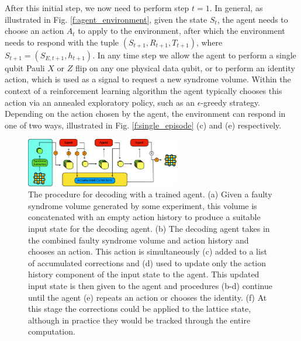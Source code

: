 \documentclass[twocolumn,preprintnumbers,amsmath,amssymb,notitlepage,nofootinbib,longbibliography,superscriptaddress,aps,pra,10pt]{revtex4-1}
\begin{document}
    After this initial step, we now need to perform step $t=1$. 
    In general, as illustrated in Fig. \ref{f:agent_environment}, given the state $S_t$, the agent needs to choose an action $A_t$ to apply to the environment, after which the environment needs to respond with the tuple $(S_{t+1}, R_{t+1}, T_{t+1})$, where $S_{t+1}=(S_{E,{t+1}},h_{t+1})$.
    In any time step we allow the agent to perform a single qubit Pauli $X$ or $Z$ flip on any one physical data qubit, or to perform an identity action, which is used as a signal to request a new syndrome volume.
    Within the context of a reinforcement learning algorithm the agent typically chooses this action via an annealed exploratory policy, such as an $\epsilon$-greedy strategy.
    Depending on the action chosen by the agent, the environment can respond in one of two ways, illustrated in Fig. \ref{f:single_episode} (c) and (e) respectively.

    \begin{figure}
      \centering
      \includegraphics[width=0.6\textwidth]{figures/agent_decoding.pdf}
      \caption{The procedure for decoding with a trained agent. (a) Given a faulty syndrome volume generated by some experiment, this volume is concatenated with an empty action history to produce a suitable input state for the decoding agent. (b) The decoding agent takes in the combined faulty syndrome volume and action history and chooses an action. This action is simultaneously (c) added to a list of accumulated corrections and (d) used to update only the action history component of the input state to the agent. This updated input state is then given to the agent and procedures (b-d) continue until the agent (e) repeats an action or chooses the identity. (f) At this stage the corrections could be applied to the lattice state, although in practice they would be tracked through the entire computation.}\label{agent_decoding}
    \end{figure}
\end{document}
